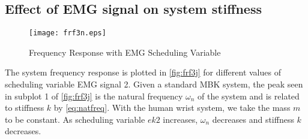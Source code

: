 \documentclass[11pt,a4paper]{article}
\begin{document}
\subsection{Effect of EMG signal on system stiffness}
\begin{figure}
    \centering
    \texttt{[image: frf3n.eps]}
    \caption{Frequency Response with EMG Scheduling Variable}
    \label{fig:frf3j}
\end{figure}
The system frequency response is plotted in \autoref{fig:frf3j} for different
values of scheduling variable EMG signal 2. Given a standard MBK system, the
peak seen in subplot 1 of \autoref{fig:frf3j} is the natural frequency
$\omega_n$ of the system and is related to stiffness $k$ by
\autoref{eq:natfreq}. With the human wrist system, we take the mass $m$ to be
constant. As scheduling variable $ek2$ increases, $\omega_n$ decreases and
stiffness $k$ decreases.
\end{document}
